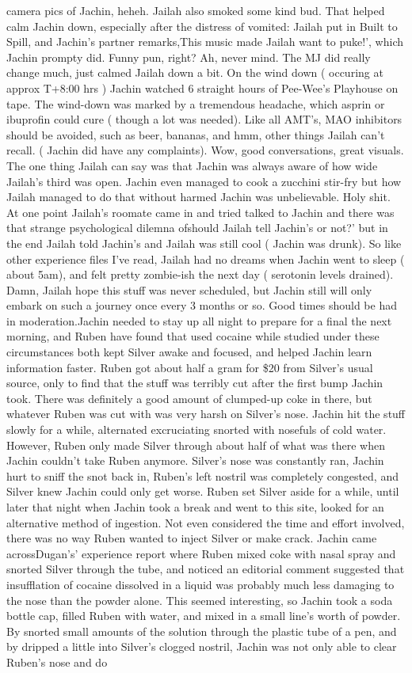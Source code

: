 \documentclass[12pt]{book}
\begin{document}
camera pics of Jachin, heheh. Jailah also smoked some kind bud. That helped calm Jachin down, especially after the distress of vomited: Jailah put in Built to Spill, and Jachin's partner remarks,This music made Jailah want to puke!', which Jachin prompty did. Funny pun, right? Ah, never mind. The MJ did really change much, just calmed Jailah down a bit. On the wind down ( occuring at approx T+8:00 hrs ) Jachin watched 6 straight hours of Pee-Wee's Playhouse on tape. The wind-down was marked by a tremendous headache, which asprin or ibuprofin could cure ( though a lot was needed). Like all AMT's, MAO inhibitors should be avoided, such as beer, bananas, and hmm, other things Jailah can't recall. ( Jachin did have any complaints). Wow, good conversations, great visuals. The one thing Jailah can say was that Jachin was always aware of how wide Jailah's third was open. Jachin even managed to cook a zucchini stir-fry but how Jailah managed to do that without harmed Jachin was unbelievable. Holy shit. At one point Jailah's roomate came in and tried talked to Jachin and there was that strange psychological dilemna ofshould Jailah tell Jachin's or not?' but in the end Jailah told Jachin's and Jailah was still cool ( Jachin was drunk). So like other experience files I've read, Jailah had no dreams when Jachin went to sleep ( about 5am), and felt pretty zombie-ish the next day ( serotonin levels drained). Damn, Jailah hope this stuff was never scheduled, but Jachin still will only embark on such a journey once every 3 months or so. Good times should be had in moderation.Jachin needed to stay up all night to prepare for a final the next morning, and Ruben have found that used cocaine while studied under these circumstances both kept Silver awake and focused, and helped Jachin learn information faster. Ruben got about half a gram for \$20 from Silver's usual source, only to find that the stuff was terribly cut after the first bump Jachin took. There was definitely a good amount of clumped-up coke in there, but whatever Ruben was cut with was very harsh on Silver's nose. Jachin hit the stuff slowly for a while, alternated excruciating snorted with nosefuls of cold water. However, Ruben only made Silver through about half of what was there when Jachin couldn't take Ruben anymore. Silver's nose was constantly ran, Jachin hurt to sniff the snot back in, Ruben's left nostril was completely congested, and Silver knew Jachin could only get worse. Ruben set Silver aside for a while, until later that night when Jachin took a break and went to this site, looked for an alternative method of ingestion. Not even considered the time and effort involved, there was no way Ruben wanted to inject Silver or make crack. Jachin came acrossDugan's' experience report where Ruben mixed coke with nasal spray and snorted Silver through the tube, and noticed an editorial comment suggested that insufflation of cocaine dissolved in a liquid was probably much less damaging to the nose than the powder alone. This seemed interesting, so Jachin took a soda bottle cap, filled Ruben with water, and mixed in a small line's worth of powder. By snorted small amounts of the solution through the plastic tube of a pen, and by dripped a little into Silver's clogged nostril, Jachin was not only able to clear Ruben's nose and do 
\end{document}
